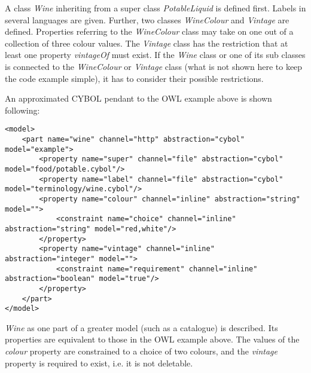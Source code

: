 A class \emph{Wine} inheriting from a super class \emph{PotableLiquid} is
defined first. Labels in several languages are given. Further, two classes
\emph{WineColour} and \emph{Vintage} are defined. Properties referring to the
\emph{WineColour} class may take on one out of a collection of three colour
values. The \emph{Vintage} class has the restriction that at least one property
\emph{vintageOf} must exist. If the \emph{Wine} class or one of its sub classes
is connected to the \emph{WineColour} or \emph{Vintage} class (what is not
shown here to keep the code example simple), it has to consider their possible
restrictions.

An approximated CYBOL pendant to the OWL example above is shown following:

\begin{scriptsize}
    \begin{verbatim}
<model>
    <part name="wine" channel="http" abstraction="cybol" model="example">
        <property name="super" channel="file" abstraction="cybol" model="food/potable.cybol"/>
        <property name="label" channel="file" abstraction="cybol" model="terminology/wine.cybol"/>
        <property name="colour" channel="inline" abstraction="string" model="">
            <constraint name="choice" channel="inline" abstraction="string" model="red,white"/>
        </property>
        <property name="vintage" channel="inline" abstraction="integer" model="">
            <constraint name="requirement" channel="inline" abstraction="boolean" model="true"/>
        </property>
    </part>
</model>
    \end{verbatim}
\end{scriptsize}

\emph{Wine} as one part of a greater model (such as a catalogue) is described.
Its properties are equivalent to those in the OWL example above. The values of
the \emph{colour} property are constrained to a choice of two colours, and the
\emph{vintage} property is required to exist, i.e. it is not deletable.
